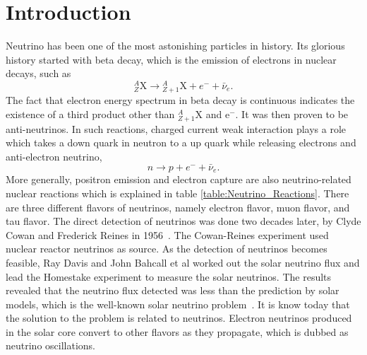 \chapter{Introduction}
\label{introduction}

Neutrino has been one of the most astonishing particles in history. Its glorious history started with beta decay, which is the emission of electrons in nuclear decays, such as
\begin{equation*}
{}^A_Z \mathrm X \to {}_{Z+1}^A\mathrm X + e^- +\bar \nu_e .
\end{equation*}
The fact that electron energy spectrum in beta decay is continuous indicates the existence of a third product other than ${}^{A}_{Z+1}\mathrm X$ and $\mathrm e^-$. It was then proven to be anti-neutrinos. In such reactions, charged current weak interaction plays a role which takes a down quark in neutron to a up quark while releasing electrons and anti-electron neutrino,
\begin{equation}
n\to p + e^- + \bar \nu_e .
\end{equation}
More generally, positron emission and electron capture are also neutrino-related nuclear reactions which is explained in table \ref{table:Neutrino_Reactions}. There are three different flavors of neutrinos, namely electron flavor, muon flavor, and tau flavor. The direct detection of neutrinos was done two decades later, by Clyde Cowan and Frederick Reines in 1956~\cite{Cowan1956}. The Cowan-Reines experiment used nuclear reactor neutrinos as source. As the detection of neutrinos becomes feasible, Ray Davis and John Bahcall et al worked out the solar neutrino flux and lead the Homestake experiment to measure the solar neutrinos. The results revealed that the neutrino flux detected was less than the prediction by solar models, which is the well-known solar neutrino problem~\cite{Bahcall1973}. It is know today that the solution to the problem is related to neutrinos. Electron neutrinos produced in the solar core convert to other flavors as they propagate, which is dubbed as neutrino oscillations.


